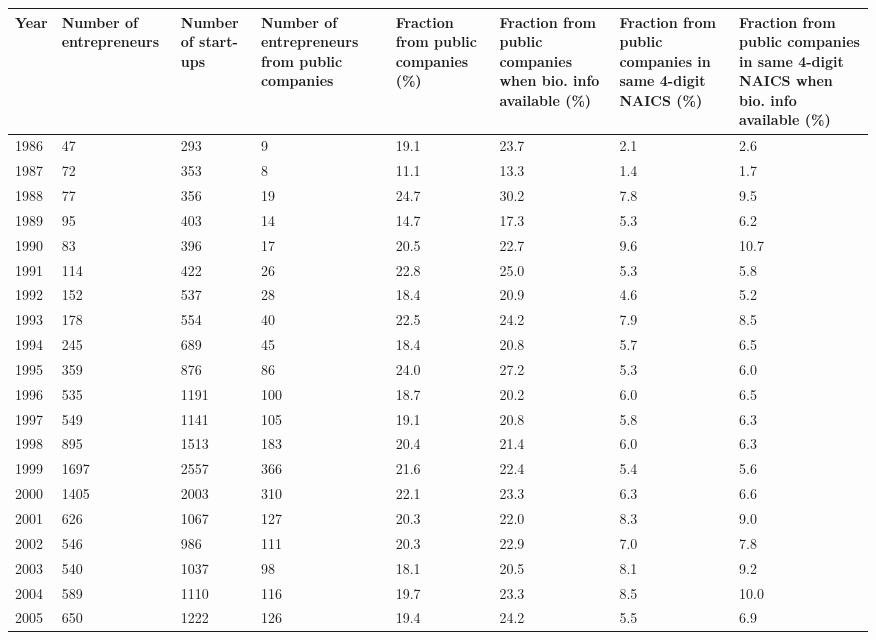 \begin{table}[!htb]
\centering
\begingroup\scriptsize
\begin{tabular}{p{1.75cm}p{1.75cm}p{1.75cm}p{1.75cm}p{1.75cm}p{1.75cm}p{1.75cm}p{1.75cm}}
  \toprule
Year & Number of entrepreneurs & Number of start-ups & Number of entrepreneurs from public companies & Fraction from public companies (\%) & Fraction from public companies when bio. info available (\%) & Fraction from public companies in same 4-digit NAICS (\%) & Fraction from public companies in same 4-digit NAICS when bio. info available (\%) \\ 
  \midrule
1986 & 47 & 293 &  9 & 19.1 & 23.7 & 2.1 & 2.6 \\ 
  1987 & 72 & 353 &  8 & 11.1 & 13.3 & 1.4 & 1.7 \\ 
  1988 & 77 & 356 & 19 & 24.7 & 30.2 & 7.8 & 9.5 \\ 
  1989 & 95 & 403 & 14 & 14.7 & 17.3 & 5.3 & 6.2 \\ 
  1990 & 83 & 396 & 17 & 20.5 & 22.7 & 9.6 & 10.7 \\ 
  1991 & 114 & 422 & 26 & 22.8 & 25.0 & 5.3 & 5.8 \\ 
  1992 & 152 & 537 & 28 & 18.4 & 20.9 & 4.6 & 5.2 \\ 
  1993 & 178 & 554 & 40 & 22.5 & 24.2 & 7.9 & 8.5 \\ 
  1994 & 245 & 689 & 45 & 18.4 & 20.8 & 5.7 & 6.5 \\ 
  1995 & 359 & 876 & 86 & 24.0 & 27.2 & 5.3 & 6.0 \\ 
  1996 & 535 & 1191 & 100 & 18.7 & 20.2 & 6.0 & 6.5 \\ 
  1997 & 549 & 1141 & 105 & 19.1 & 20.8 & 5.8 & 6.3 \\ 
  1998 & 895 & 1513 & 183 & 20.4 & 21.4 & 6.0 & 6.3 \\ 
  1999 & 1697 & 2557 & 366 & 21.6 & 22.4 & 5.4 & 5.6 \\ 
  2000 & 1405 & 2003 & 310 & 22.1 & 23.3 & 6.3 & 6.6 \\ 
  2001 & 626 & 1067 & 127 & 20.3 & 22.0 & 8.3 & 9.0 \\ 
  2002 & 546 & 986 & 111 & 20.3 & 22.9 & 7.0 & 7.8 \\ 
  2003 & 540 & 1037 & 98 & 18.1 & 20.5 & 8.1 & 9.2 \\ 
  2004 & 589 & 1110 & 116 & 19.7 & 23.3 & 8.5 & 10.0 \\ 
  2005 & 650 & 1222 & 126 & 19.4 & 24.2 & 5.5 & 6.9 \\ 

\end{tabular}
\end{table}
